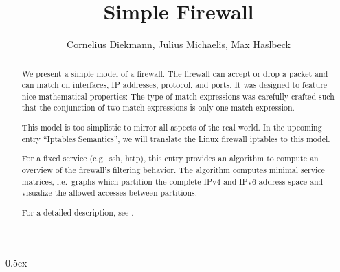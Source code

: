 \documentclass[11pt,a4paper]{article}
\begin{document}
\title{Simple Firewall}
\author{Cornelius Diekmann, Julius Michaelis, Max Haslbeck}
\maketitle

\begin{abstract}  
  We present a simple model of a firewall. 
  The firewall can accept or drop a packet and can match on interfaces, IP addresses, protocol, and ports. 
  It was designed to feature nice mathematical properties: 
  The type of match expressions was carefully crafted such that the conjunction of two match expressions is only one match expression. 
  
  This model is too simplistic to mirror all aspects of the real world. 
  In the upcoming entry ``Iptables Semantics'', we will translate the Linux firewall iptables to this model. 
  
  For a fixed service (e.g.\ ssh, http), this entry provides an algorithm to compute an overview of the firewall's filtering behavior. 
  The algorithm computes minimal service matrices, i.e.\ graphs which partition the complete IPv4 and IPv6 address space and visualize the allowed accesses between partitions. 

For a detailed description, see \cite{diekmann2016networking}. 
\end{abstract}

\tableofcontents

\parindent 0pt\parskip 0.5ex





\end{document}
